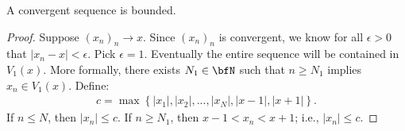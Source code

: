     \begin{proposition}
        A convergent sequence is bounded.
    \end{proposition}
        \begin{proof}
            Suppose $(x_n)_n \rightarrow x$. Since $(x_n)_n$ is convergent, we know for all $\epsilon > 0$ that $|x_n - x| < \epsilon$. Pick $\epsilon = 1$. Eventually the entire sequence will be contained in $V_1(x)$. More formally, there exists $N_1 \in \bfN$ such that $n \geq N_1$ implies $x_n \in V_1(x)$. Define:
                \begin{equation*}
                \begin{split}
                    c = \max \left\{|x_1|,|x_2|,...,|x_N|,|x-1|,|x+1|\right\}.
                \end{split}
                \end{equation*}
            If $n \leq N$, then $|x_n| \leq c$. If $n \geq N_1$, then $x-1 < x_n < x+1$; i.e., $|x_n| \leq c$.
        \end{proof}

